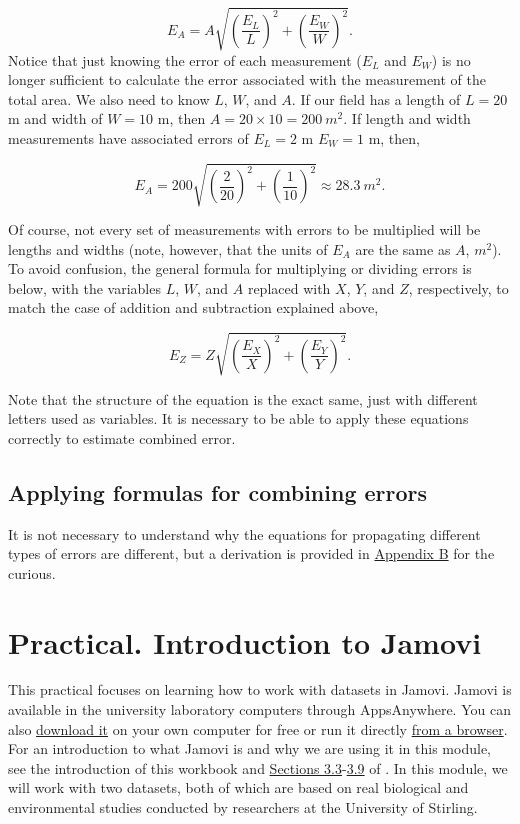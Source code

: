 \documentclass[
]{scrbook}
\begin{document}
\[E_{A} = A \sqrt{\left(\frac{E_{L}}{L} \right)^{2} + \left(\frac{E_{W}}{W} \right)^{2}}.\]
Notice that just knowing the error of each measurement (\(E_{L}\) and \(E_{W}\)) is no longer sufficient to calculate the error associated with the measurement of the total area.
We also need to know \(L\), \(W\), and \(A\).
If our field has a length of \(L = 20\) m and width of \(W = 10\) m, then \(A = 20 \times 10 = 200\:m^{2}\).
If length and width measurements have associated errors of \(E_{L} = 2\) m \(E_{W} = 1\) m, then,

\[E_{A} = 200 \sqrt{\left(\frac{2}{20} \right)^{2} + \left(\frac{1}{10} \right)^{2}} \approx 28.3\:m^{2}.\]

Of course, not every set of measurements with errors to be multiplied will be lengths and widths (note, however, that the units of \(E_{A}\) are the same as \(A\), \(m^{2}\)).
To avoid confusion, the general formula for multiplying or dividing errors is below, with the variables \(L\), \(W\), and \(A\) replaced with \(X\), \(Y\), and \(Z\), respectively, to match the case of addition and subtraction explained above,

\[E_{Z} = Z \sqrt{\left(\frac{E_{X}}{X} \right)^{2} + \left(\frac{E_{Y}}{Y} \right)^{2}}.\]

Note that the structure of the equation is the exact same, just with different letters used as variables.
It is necessary to be able to apply these equations correctly to estimate combined error.

\hypertarget{applying-formulas-for-combining-errors}{%
\section{Applying formulas for combining errors}\label{applying-formulas-for-combining-errors}}

It is not necessary to understand why the equations for propagating different types of errors are different, but a derivation is provided in \protect\hyperlink{uncertainty_derivation}{Appendix B} for the curious.

\hypertarget{Chapter_8}{%
\chapter{Practical. Introduction to Jamovi}\label{Chapter_8}}

This practical focuses on learning how to work with datasets in Jamovi.
Jamovi is available in the university laboratory computers through AppsAnywhere.
You can also \href{https://www.jamovi.org/download.html}{download it} on your own computer for free or run it directly \href{https://www.jamovi.org/cloud.html}{from a browser}.
For an introduction to what Jamovi is and why we are using it in this module, see the introduction of this workbook and \href{https://davidfoxcroft.github.io/lsj-book/03-Getting-started-with-jamovi.html\#the-spreadsheet}{Sections 3.3}-\href{https://davidfoxcroft.github.io/lsj-book/03-Getting-started-with-jamovi.html\#summary}{3.9} of \citet{Navarro2022}.
In this module, we will work with two datasets, both of which are based on real biological and environmental studies conducted by researchers at the University of Stirling.
\end{document}
